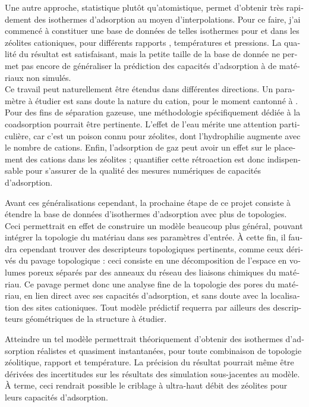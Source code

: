 \documentclass[thesis]{subfiles}
\begin{document}
\begin{otherlanguage}{french}
Une autre approche, statistique plutôt qu'atomistique, permet d'obtenir très rapidement des isothermes d'adsorption au moyen d'interpolations. Pour ce faire, j'ai commencé à constituer une base de données de telles isothermes pour  et  dans les zéolites cationiques, pour différents rapports \SiAl, températures et pressions. La qualité du résultat est satisfaisant, mais la petite taille de la base de donnée ne permet pas encore de généraliser la prédiction des capacités d'adsorption à de matériaux non simulés.\\

Ce travail peut naturellement être étendus dans différentes directions. Un paramètre à étudier est sans doute la nature du cation, pour le moment cantonné à . Pour des fins de séparation gazeuse, une méthodologie spécifiquement dédiée à la coadsorption pourrait être pertinente. L'effet de l'eau mérite une attention particulière, car c'est un poison connu pour zéolites, dont l'hydrophilie augmente avec le nombre de cations. Enfin, l'adsorption de gaz peut avoir un effet sur le placement des cations dans les zéolites ; quantifier cette rétroaction est donc indispensable pour s'assurer de la qualité des mesures numériques de capacités d'adsorption.

Avant ces généralisations cependant, la prochaine étape de ce projet consiste à étendre la base de données d'isothermes d'adsorption avec plus de topologies. Ceci permettrait en effet de construire un modèle beaucoup plus général, pouvant intégrer la topologie du matériau dans ses paramètres d'entrée. À cette fin, il faudra cependant trouver des descripteurs topologiques pertinents, comme ceux dérivés du pavage topologique : ceci consiste en une décomposition de l'espace en volumes poreux séparés par des anneaux du réseau des liaisons chimiques du matériau. Ce pavage permet donc une analyse fine de la topologie des pores du matériau, en lien direct avec ses capacités d'adsorption, et sans doute avec la localisation des sites cationiques. Tout modèle prédictif requerra par ailleurs des descripteurs géométriques de la structure à étudier.

Atteindre un tel modèle permettrait théoriquement d'obtenir des isothermes d'adsorption réalistes et quasiment instantanées, pour toute combinaison de topologie zéolitique, rapport \SiAl et température. La précision du résultat pourrait même être dérivées des incertitudes sur les résultats des simulation sous-jacentes au modèle. À terme, ceci rendrait possible le criblage à ultra-haut débit des zéolites pour leurs capacités d'adsorption.


\end{otherlanguage}
\end{document}
